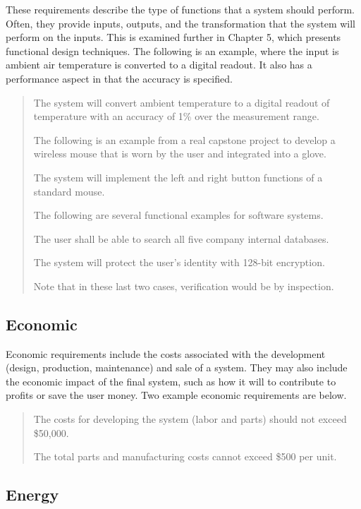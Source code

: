 These requirements describe the type of functions that a system should
perform. Often, they provide inputs, outputs, and the transformation
that the system will perform on the inputs. This is examined further in
Chapter 5, which presents functional design techniques. The following is
an example, where the input is ambient air temperature is converted to a
digital readout. It also has a performance aspect in that the accuracy
is specified.

\begin{quote}
The system will convert ambient temperature to a digital readout of
temperature with an accuracy of 1\% over the measurement range.

The following is an example from a real capstone project to develop a
wireless mouse that is worn by the user and integrated into a glove.

The system will implement the left and right button functions of a
standard mouse.

The following are several functional examples for software systems.

The user shall be able to search all five company internal databases.

The system will protect the user's identity with 128-bit encryption.

Note that in these last two cases, verification would be by inspection.
\end{quote}

\subsection*{Economic}
\label{section:economic}

Economic requirements include the costs associated with the development
(design, production, maintenance) and sale of a system. They may also
include the economic impact of the final system, such as how it will to
contribute to profits or save the user money. Two example economic
requirements are below.

\begin{quote}
The costs for developing the system (labor and parts) should not exceed
\$50,000.

The total parts and manufacturing costs cannot exceed \$500 per unit.
\end{quote}

\subsection*{Energy}
\label{section:energy}

